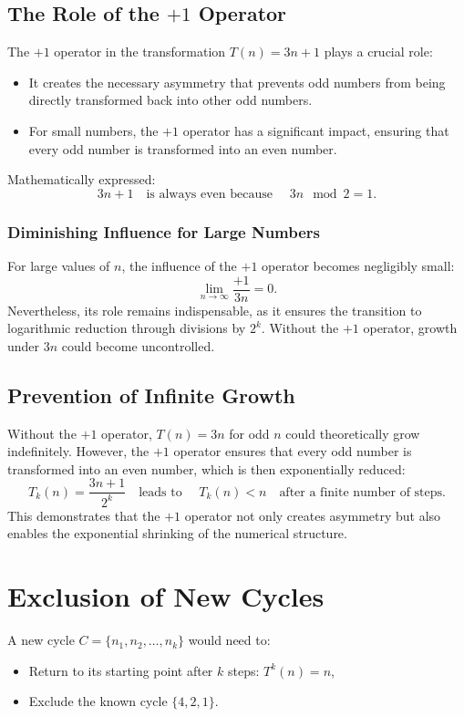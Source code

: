 \documentclass[a4paper,12pt]{article}
\begin{document}
\subsection{The Role of the \(+1\) Operator}
The \(+1\) operator in the transformation \( T(n) = 3n + 1 \) plays a crucial role:
\begin{itemize}
    \item It creates the necessary asymmetry that prevents odd numbers from being directly transformed back into other odd numbers.
    \item For small numbers, the \(+1\) operator has a significant impact, ensuring that every odd number is transformed into an even number.
\end{itemize}

Mathematically expressed:
\[
3n + 1 \quad \text{is always even because } \quad 3n \mod 2 = 1.
\]

\subsubsection{Diminishing Influence for Large Numbers}
For large values of \( n \), the influence of the \(+1\) operator becomes negligibly small:
\[
\lim_{n \to \infty} \frac{+1}{3n} = 0.
\]
Nevertheless, its role remains indispensable, as it ensures the transition to logarithmic reduction through divisions by \( 2^k \). Without the \(+1\) operator, growth under \( 3n \) could become uncontrolled.

\subsection{Prevention of Infinite Growth}
Without the \(+1\) operator, \( T(n) = 3n \) for odd \( n \) could theoretically grow indefinitely. However, the \(+1\) operator ensures that every odd number is transformed into an even number, which is then exponentially reduced:
\[
T_k(n) = \frac{3n + 1}{2^k} \quad \text{leads to } \quad T_k(n) < n \quad \text{after a finite number of steps}.
\]
This demonstrates that the \(+1\) operator not only creates asymmetry but also enables the exponential shrinking of the numerical structure.

\section{Exclusion of New Cycles}
A new cycle \( C = \{n_1, n_2, \dots, n_k\} \) would need to:
\begin{itemize}
    \item Return to its starting point after \( k \) steps: \( T^k(n) = n \),
    \item Exclude the known cycle \( \{4, 2, 1\} \).
\end{itemize}
\end{document}

